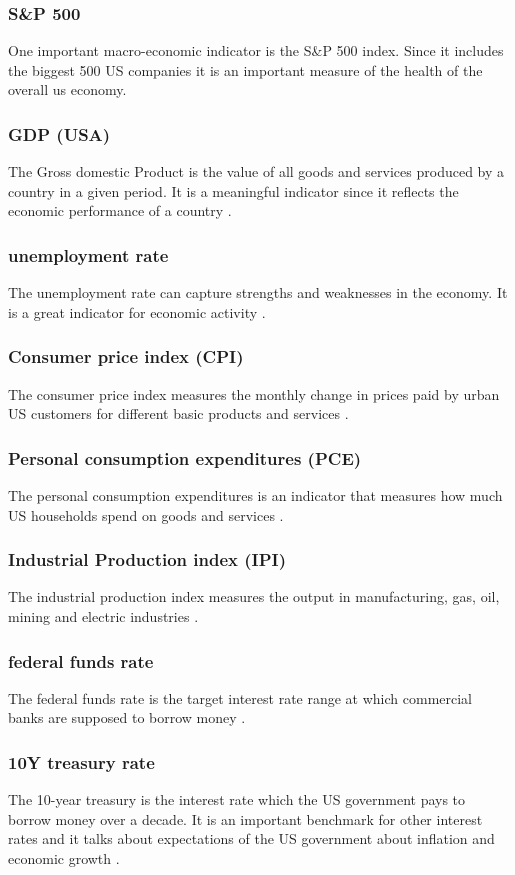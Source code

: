 \documentclass[a4paper,12pt]{report}
\begin{document}
			\subsubsection{S\&P 500}
			One important macro-economic indicator is the S\&P 500 index. Since it includes the biggest 500 US companies it is an important measure of the health of the overall us economy.
			\subsubsection{GDP (USA)}
			The Gross domestic Product is the value of all goods and services produced by a country in a given period. It is a meaningful indicator since it reflects the economic performance of a country \cite{38}.
			\subsubsection{unemployment rate}
			The unemployment rate can capture strengths and weaknesses in the economy. It is a great indicator for economic activity \cite{38}.
			\subsubsection{Consumer price index (CPI)}
			The consumer price index measures the monthly change in prices paid by urban US customers for different basic products and services \cite{39}.
			\subsubsection{Personal consumption expenditures (PCE)}
			The personal consumption expenditures is an indicator that measures how much US households spend on goods and services \cite{41}.
			\subsubsection{Industrial Production index (IPI)}
			The industrial production index measures the output in manufacturing, gas, oil, mining and electric industries \cite{42}.
			\subsubsection{federal funds rate}
			The federal funds rate is the target interest rate range at which commercial banks are supposed to borrow money \cite{43}.
			\subsubsection{10Y treasury rate}
			The 10-year treasury is the interest rate which the US government pays to borrow money over a decade. It is an important benchmark for other interest rates and it talks about expectations of the US government about inflation and economic growth \cite{44}.
\end{document}
